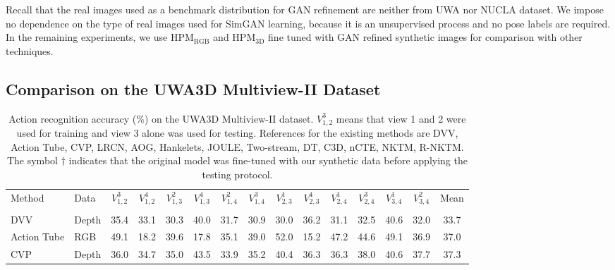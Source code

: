 \documentclass[twocolumn]{svjour3}          \smartqed  \usepackage{graphicx}
\begin{document}
Recall that the real images used as a benchmark distribution for GAN refinement are neither from UWA nor NUCLA dataset. We impose no dependence on the type of real images used for SimGAN learning, because it is an unsupervised process and no pose labels are required. In the remaining experiments, we use  HPM$_{\mathrm{RGB}}$ and HPM$_{\mathrm{3D}}$ fine tuned with GAN refined synthetic images for comparison with other techniques.




\subsection{Comparison on the UWA3D Multiview-II Dataset}
\label{sec:UWA3D}


\begin{table*}[t]
\centering
\caption{Action recognition accuracy (\%) on the UWA3D Multiview-II dataset. $V_{1,2}^3$ means that view 1 and 2 were used for training and view 3 alone was used for testing. References for the existing methods are DVV\citep{DVV}, Action Tube\citep{Action_Tube}, CVP\citep{CVP}, LRCN\citep{LRCN}, AOG\citep{AOG}, Hankelets\citep{Hankelets}, JOULE\citep{hu2015jointly}, Two-stream\citep{simonyan2014two}, DT\citep{wang2011action}, C3D\citep{tran2015learning}, nCTE\citep{nCTE}, NKTM\citep{NKTM}, R-NKTM\citep{rahmani2017learning}. The symbol $\dagger$ indicates that the original model was fine-tuned with our synthetic data before applying the testing protocol.}
\setlength{\tabcolsep}{4.75pt}
\begin{tabular}{llccccccccccccc}
\hline\noalign{\smallskip}
Method & Data & $V_{1,2}^3$ & $V_{1,2}^4$ & $V_{1,3}^2$ & $V_{1,3}^4$ & $V_{1,4}^2$ & $V_{1,4}^3$ & $V_{2,3}^1$ & $V_{2,3}^4$ & $V_{2,4}^1$ & $V_{2,4}^3$ & $V_{3,4}^1$ & $V_{3,4}^2$ & Mean \\
\noalign{\smallskip}\hline\noalign{\smallskip}
\multicolumn{ 15}{c}{\textbf{Baseline}} \\ 
\noalign{\smallskip}\hline\noalign{\smallskip}
DVV & Depth & 35.4 & 33.1 & 30.3 & 40.0 & 31.7 & 30.9 & 30.0 & 36.2 & 31.1 & 32.5 & 40.6 & 32.0 & 33.7 \\ 

Action Tube & RGB & 49.1 & 18.2 & 39.6 & 17.8 & 35.1 & 39.0 & 52.0 & 15.2 & 47.2 & 44.6 & 49.1 & 36.9 & 37.0 \\ 

CVP & Depth & 36.0 & 34.7 & 35.0 & 43.5 & 33.9 & 35.2 & 40.4 & 36.3 & 36.3 & 38.0 & 40.6 & 37.7 & 37.3 \\


\end{tabular}
\end{table*}
\end{document}
